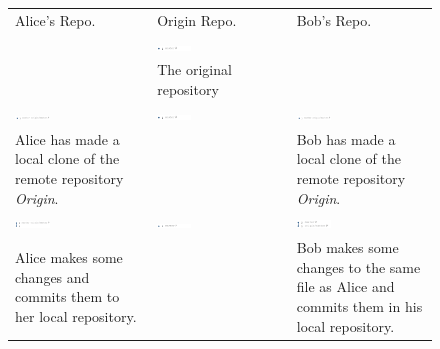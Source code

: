 \begin{figure}[htbp]
  \begin{tabulary}{\textwidth}{LLL}
    Alice's Repo. & Origin Repo. & Bob's Repo.\\

    &
    \includegraphics[width=0.27\textwidth]{Figures/background/foxtrot/origin_1.png} &
    \\
    & \tiny{The original repository} & \\

        \includegraphics[width=0.27\textwidth]{Figures/background/foxtrot/alice_1.png} &
    \includegraphics[width=0.27\textwidth]{Figures/background/foxtrot/origin_1.png} &
    \includegraphics[width=0.27\textwidth]{Figures/background/foxtrot/alice_1.png} \\

    \tiny{
    Alice has made a local clone of the remote repository
    \textit{Origin}.}
    &
    &
    \tiny{Bob has made a local clone of the remote repository
    \textit{Origin}.}
    \\



    \includegraphics[width=0.27\textwidth]{Figures/background/foxtrot/alice_2.png} &
    \includegraphics[width=0.27\textwidth]{Figures/background/foxtrot/origin_1.png} &
    \includegraphics[width=0.27\textwidth]{Figures/background/foxtrot/bob_2.png} \\

    \tiny{Alice makes some changes and commits them to her local repository.}
    &
    &
    \tiny{Bob makes some changes to the same file as Alice and commits them in
    his local repository.}
    \\





\end{tabulary}
\end{figure}
